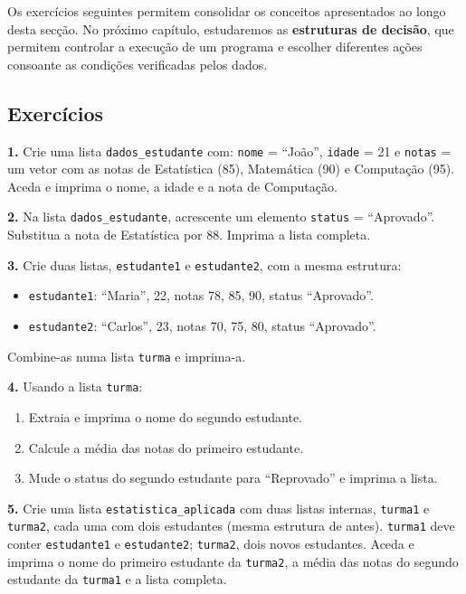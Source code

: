 \documentclass[
  portuguese,
  11pt,
  openany]{book}
\providecommand{\tightlist}{%
  \setlength{\itemsep}{0pt}\setlength{\parskip}{0pt}}
\begin{document}
Os exercícios seguintes permitem consolidar os conceitos apresentados ao longo desta secção. No próximo capítulo, estudaremos as \textbf{estruturas de decisão}, que permitem controlar a execução de um programa e escolher diferentes ações consoante as condições verificadas pelos dados.

\subsection{Exercícios}\label{exercuxedcios-5}

\textbf{1.} Crie uma lista \texttt{dados\_estudante} com: \texttt{nome} = ``João'', \texttt{idade} = 21 e
\texttt{notas} = um vetor com as notas de Estatística (85), Matemática (90) e Computação
(95). Aceda e imprima o nome, a idade e a nota de Computação.

\textbf{2.} Na lista \texttt{dados\_estudante}, acrescente um elemento \texttt{status} = ``Aprovado''.
Substitua a nota de Estatística por 88. Imprima a lista completa.

\textbf{3.} Crie duas listas, \texttt{estudante1} e \texttt{estudante2}, com a mesma estrutura:

\begin{itemize}
\tightlist
\item
  \texttt{estudante1}: ``Maria'', 22, notas 78, 85, 90, status ``Aprovado''.
\item
  \texttt{estudante2}: ``Carlos'', 23, notas 70, 75, 80, status ``Aprovado''.
\end{itemize}

Combine-as numa lista \texttt{turma} e imprima-a.

\textbf{4.} Usando a lista \texttt{turma}:

\begin{enumerate}
\def\labelenumi{(\alph{enumi})}
\tightlist
\item
  Extraia e imprima o nome do segundo estudante.
\item
  Calcule a média das notas do primeiro estudante.
\item
  Mude o status do segundo estudante para ``Reprovado'' e imprima a lista.
\end{enumerate}

\textbf{5.} Crie uma lista \texttt{estatistica\_aplicada} com duas listas internas, \texttt{turma1} e
\texttt{turma2}, cada uma com dois estudantes (mesma estrutura de antes). \texttt{turma1} deve
conter \texttt{estudante1} e \texttt{estudante2}; \texttt{turma2}, dois novos estudantes. Aceda e
imprima o nome do primeiro estudante da \texttt{turma2}, a média das notas do segundo
estudante da \texttt{turma1} e a lista completa.
\end{document}
